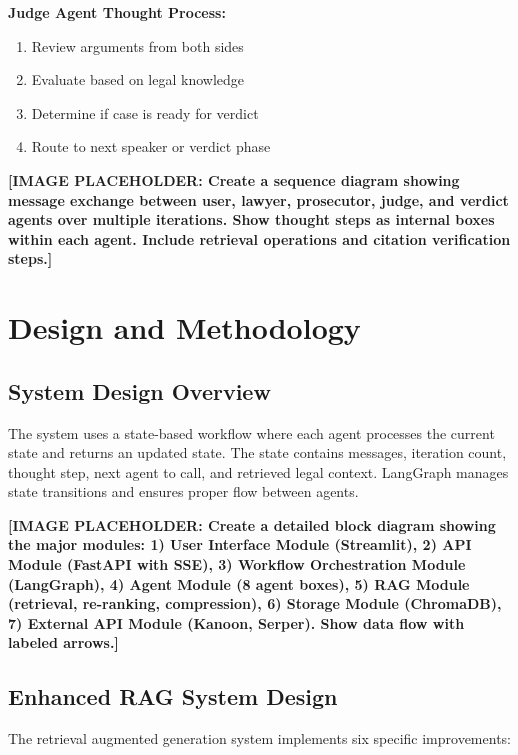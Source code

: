 \documentclass[12pt,singleside,a4paper]{article}
\begin{document}
\textbf{Judge Agent Thought Process:}
\begin{enumerate}
\item Review arguments from both sides
\item Evaluate based on legal knowledge
\item Determine if case is ready for verdict
\item Route to next speaker or verdict phase
\end{enumerate}

\textbf{[IMAGE PLACEHOLDER: Create a sequence diagram showing message exchange between user, lawyer, prosecutor, judge, and verdict agents over multiple iterations. Show thought steps as internal boxes within each agent. Include retrieval operations and citation verification steps.]}

\pagebreak
\section{Design and Methodology}

\subsection{System Design Overview}
The system uses a state-based workflow where each agent processes the current state and returns an updated state. The state contains messages, iteration count, thought step, next agent to call, and retrieved legal context. LangGraph manages state transitions and ensures proper flow between agents.

\textbf{[IMAGE PLACEHOLDER: Create a detailed block diagram showing the major modules: 1) User Interface Module (Streamlit), 2) API Module (FastAPI with SSE), 3) Workflow Orchestration Module (LangGraph), 4) Agent Module (8 agent boxes), 5) RAG Module (retrieval, re-ranking, compression), 6) Storage Module (ChromaDB), 7) External API Module (Kanoon, Serper). Show data flow with labeled arrows.]}

\subsection{Enhanced RAG System Design}
The retrieval augmented generation system implements six specific improvements:
\end{document}
